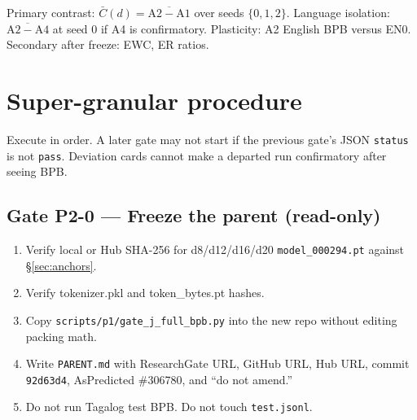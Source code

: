 \documentclass[11pt,a4paper]{article}
\begin{document}
Primary contrast: $\bar C(d)=\overline{\mathrm{A2}-\mathrm{A1}}$ over seeds $\{0,1,2\}$. Language isolation: $\overline{\mathrm{A2}-\mathrm{A4}}$ at seed 0 if A4 is confirmatory. Plasticity: A2 English BPB versus EN0. Secondary after freeze: EWC, ER ratios.

\section{Super-granular procedure}
\label{sec:steps}

Execute in order. A later gate may not start if the previous gate's JSON \texttt{status} is not \texttt{pass}. Deviation cards cannot make a departed run confirmatory after seeing BPB.

\subsection{Gate P2-0 --- Freeze the parent (read-only)}
\begin{enumerate}
\item Verify local or Hub SHA-256 for d8/d12/d16/d20 \texttt{model\_000294.pt} against §\ref{sec:anchors}.
\item Verify tokenizer.pkl and token\_bytes.pt hashes.
\item Copy \texttt{scripts/p1/gate\_j\_full\_bpb.py} into the new repo without editing packing math.
\item Write \texttt{PARENT.md} with ResearchGate URL, GitHub URL, Hub URL, commit \texttt{92d63d4}, AsPredicted \#306780, and ``do not amend.''
\item Do not run Tagalog test BPB. Do not touch \texttt{test.jsonl}.
\end{enumerate}
\end{document}
